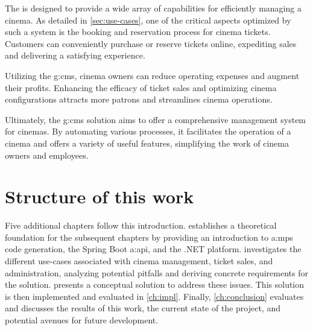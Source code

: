 The  is designed to provide a wide array of capabilities for efficiently managing a cinema. As detailed in \cref{sec:use-cases}, one of the critical aspects optimized by such a system is the booking and reservation process for cinema tickets. Customers can conveniently purchase or reserve tickets online, expediting sales and delivering a satisfying experience.

Utilizing the \gls{g:cms}, cinema owners can reduce operating expenses and augment their profits. Enhancing the efficacy of ticket sales and optimizing cinema configurations attracts more patrons and streamlines cinema operations.

Ultimately, the \gls{g:cms} solution aims to offer a comprehensive management system for cinemas. By automating various processes, it facilitates the operation of a cinema and offers a variety of useful features, simplifying the work of cinema owners and employees.

\section{Structure of this work}

Five additional chapters follow this introduction.  establishes a theoretical foundation for the subsequent chapters by providing an introduction to \gls{a:mps} code generation, the Spring Boot \gls{a:api}, and the .NET platform.  investigates the different use-cases associated with cinema management, ticket sales, and administration, analyzing potential pitfalls and deriving concrete requirements for the solution.  presents a conceptual solution to address these issues. This solution is then implemented and evaluated in \cref{ch:impl}. Finally, \cref{ch:conclusion} evaluates and discusses the results of this work, the current state of the project, and potential avenues for future development.